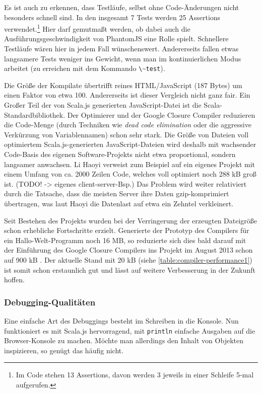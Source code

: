 \documentclass[a4paper, 12pt, hidelinks, listof=totoc, listoftables=totoc, bibliography=totoc]{scrreprt}
\newcommand{\code}[1]{\lstinline[language=Scala, style=inline]|#1|}
\newcommand{\scala}[1]{\lstinline[language=Scala, style=inline]|#1|}
\begin{document}
Es ist auch zu erkennen, dass Testläufe, selbst ohne Code-Änderungen nicht besonders schnell sind. In den insgesamt 7 Tests werden 25 Assertions verwendet.\footnote{Im Code stehen 13 Assertions, davon werden 3 jeweils in einer Schleife 5-mal aufgerufen.} Hier darf gemutmaßt werden, ob dabei auch die Ausführungsgeschwindigkeit von PhantomJS eine Rolle spielt. Schnellere Testläufe wären hier in jedem Fall wünschenswert. Andererseits fallen etwas langsamere Tests weniger ins Gewicht, wenn man im kontinuierlichen Modus arbeitet (zu erreichen mit dem Kommando \code{\~test}).

Die Größe der Kompilate übertrifft reines HTML/JavaScript (187 Bytes) um einen Faktor von etwa 100. Andererseits ist dieser Vergleich nicht ganz fair. Ein Großer Teil der von Scala.js generierten JavaScript-Datei ist die Scala-Standardbibliothek.
Der Optimierer und der Google Closure Compiler reduzieren die Code-Menge (durch Techniken wie \textit{dead code elimination} oder die aggressive Verkürzung von Variablennamen) schon sehr stark. Die Größe von Dateien voll optimiertem Scala.js-generierten JavaScript-Dateien wird deshalb mit wachsender Code-Basis des eigenen Software-Projekts nicht etwa proportional, sondern langsamer anwachsen. Li Haoyi verweist zum Beispiel auf ein eigenes Projekt mit einem Umfang von ca. 2000 Zeilen Code, welches voll optimiert noch 288 kB groß ist. (TODO! -> eigenes client-server-Bsp.) Das Problem wird weiter relativiert durch die Tatsache, dass die meisten Server ihre Daten gzip-komprimiert übertragen, was laut Haoyi die Datenlast auf etwa ein Zehntel verkleinert.\cite[\#BlobSize]{haoyi.HOS}

Seit Bestehen des Projekts wurden bei der Verringerung der erzeugten Dateigröße schon erhebliche Fortschritte erzielt. Generierte der Prototyp des Compilers für ein Hallo-Welt-Programm noch 16 MB, so reduzierte sich dies bald darauf mit der Einführung des Google Closure Compilers ins Projekt im August 2013 schon auf 900 kB \cite[Folie 5 f., Min. 6]{doeraene2014.WHB}. Der aktuelle Stand mit 20 kB (siehe \ref{table:compiler-performance1}) ist somit schon erstaunlich gut und lässt auf weitere Verbesserung in der Zukunft hoffen.

\subsubsection{Debugging-Qualitäten}


Eine einfache Art des Debuggings besteht im Schreiben in die Konsole. Nun funktioniert es mit Scala.js hervorragend, mit \scala{println} einfache Ausgaben auf die Browser-Konsole zu machen. Möchte man allerdings den Inhalt von Objekten inspizieren, so genügt das häufig nicht. 
\end{document}
